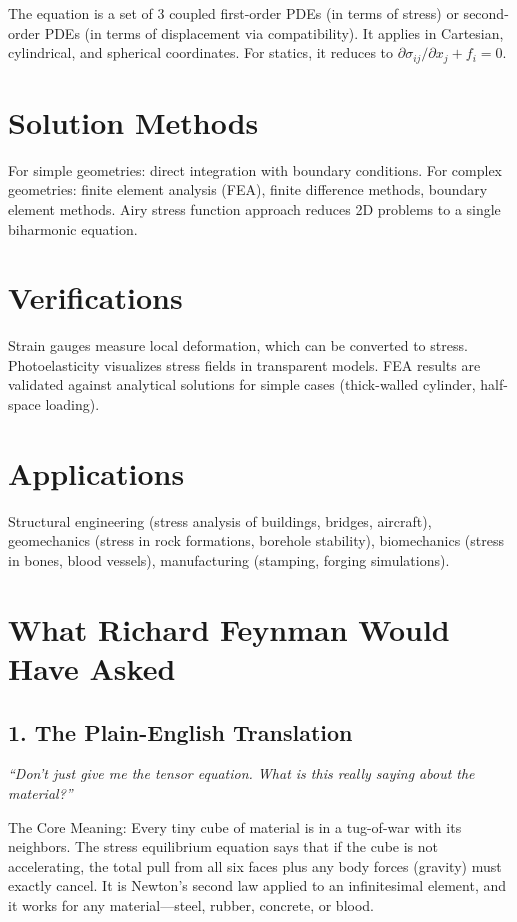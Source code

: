 The equation is a set of 3 coupled first-order PDEs (in terms of stress) or second-order PDEs (in terms of displacement via compatibility). It applies in Cartesian, cylindrical, and spherical coordinates. For statics, it reduces to $\partial \sigma_{ij}/\partial x_j + f_i = 0$.
\section*{Solution Methods}

For simple geometries: direct integration with boundary conditions. For complex geometries: finite element analysis (FEA), finite difference methods, boundary element methods. Airy stress function approach reduces 2D problems to a single biharmonic equation.
\section*{Verifications}

Strain gauges measure local deformation, which can be converted to stress. Photoelasticity visualizes stress fields in transparent models. FEA results are validated against analytical solutions for simple cases (thick-walled cylinder, half-space loading).
\section*{Applications}

Structural engineering (stress analysis of buildings, bridges, aircraft), geomechanics (stress in rock formations, borehole stability), biomechanics (stress in bones, blood vessels), manufacturing (stamping, forging simulations).
\section*{What Richard Feynman Would Have Asked}

\subsection*{1. The Plain-English Translation}
\textit{``Don't just give me the tensor equation. What is this really saying about the material?''}

The Core Meaning: Every tiny cube of material is in a tug-of-war with its neighbors. The stress equilibrium equation says that if the cube is not accelerating, the total pull from all six faces plus any body forces (gravity) must exactly cancel. It is Newton's second law applied to an infinitesimal element, and it works for any material---steel, rubber, concrete, or blood.


